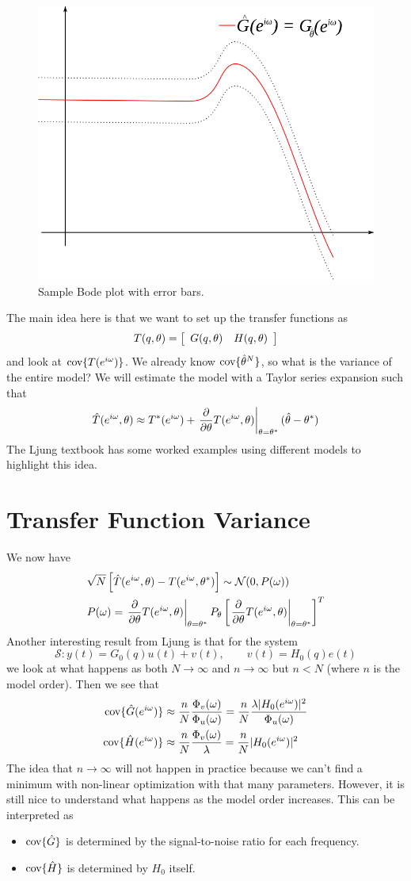 \begin{figure}[ht!]
	\centering
	\includegraphics[width=.25\textwidth]{images/15bode1}
	\caption{Sample Bode plot with error bars.}
	\label{fig:15bode1}
\end{figure}

The main idea here is that we want to set up the transfer functions as
$$T(q,\theta) = \left[\begin{array}{c c} G(q,\theta) & H(q,\theta) \end{array}\right]$$
and look at $\text{cov}\{T(e^{i\omega})\}$. We already know $\text{cov}\{\hat{\theta}^N\}$, so what is the variance of the entire model? We will estimate the model with a Taylor series expansion such that
$$\hat{T}(e^{i\omega},\theta) \approx T^\ast(e^{i\omega}) + \left.\frac{\partial}{\partial\theta} T(e^{i\omega},\theta)\right|_{\theta=\theta^\ast}(\hat{\theta}-\theta^\ast)$$
The Ljung textbook has some worked examples using different models to highlight this idea.

\section{Transfer Function Variance}
We now have
\begin{align*}
&\sqrt{N}\left[\hat{T}(e^{i\omega},\theta) - T(e^{i\omega},\theta^\ast)\right] \sim \mathcal{N}(0,P(\omega)) \\
&P(\omega) = \left.\frac{\partial}{\partial\theta} T(e^{i\omega},\theta)\right|_{\theta=\theta^\ast} P_\theta \left[\left.\frac{\partial}{\partial\theta} T(e^{i\omega},\theta)\right|_{\theta=\theta^\ast}\right]^T
\end{align*}
Another interesting result from Ljung is that for the system
$$\mathcal{S}: y(t) = G_0(q)u(t)+v(t), \qquad v(t) = H_0(q)e(t)$$
we look at what happens as both $N\to\infty$ and $n\to\infty$ but $n<N$ (where $n$ is the model order). Then we see that
\begin{align*}
\text{cov}\{\hat{G}(e^{i\omega})\} &\approx \frac{n}{N}\frac{\Phi_v(\omega)}{\Phi_u(\omega)} = \frac{n}{N}\frac{\lambda|H_0(e^{i\omega})|^2}{\Phi_u(\omega)} \\
\text{cov}\{\hat{H}(e^{i\omega})\} &\approx \frac{n}{N}\frac{\Phi_v(\omega)}{\lambda} = \frac{n}{N}|H_0(e^{i\omega})|^2
\end{align*}
The idea that $n\to\infty$ will not happen in practice because we can't find a minimum with non-linear optimization with that many parameters. However, it is still nice to understand what happens as the model order increases. This can be interpreted as
\begin{itemize}
\item $\text{cov}\{\hat{G}\}$ is determined by the signal-to-noise ratio for each frequency.
\item $\text{cov}\{\hat{H}\}$ is determined by $H_0$ itself.
\end{itemize}

